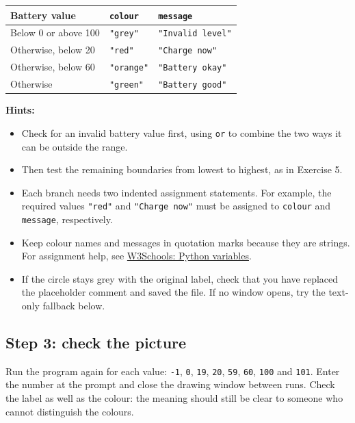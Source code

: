 \documentclass[12pt,a4paper]{article}
\begin{document}
\begingroup\small\renewcommand{\arraystretch}{1.3}\begin{longtable}{>{\raggedright\arraybackslash}p{}>{\raggedright\arraybackslash}p{}>{\raggedright\arraybackslash}p{}}
\toprule
\rowcolor{panel} Battery value & \texttt{colour} & \texttt{message} \\ \midrule\endhead
Below 0 or above 100 & \texttt{"grey"} & \texttt{"Invalid level"} \\
Otherwise, below 20 & \texttt{"red"} & \texttt{"Charge now"} \\
Otherwise, below 60 & \texttt{"orange"} & \texttt{"Battery okay"} \\
Otherwise & \texttt{"green"} & \texttt{"Battery good"} \\
\bottomrule\end{longtable}\endgroup
\textbf{Hints:}

\begin{itemize}
\item Check for an invalid battery value first, using \texttt{or} to combine the two ways it can be outside the range.
\item Then test the remaining boundaries from lowest to highest, as in Exercise 5.
\item Each branch needs two indented assignment statements. For example, the required values \texttt{"red"} and \texttt{"Charge now"} must be assigned to \texttt{colour} and \texttt{message}, respectively.
\item Keep colour names and messages in quotation marks because they are strings. For assignment help, see \href{https://www.w3schools.com/python/python_variables.asp}{W3Schools: Python variables}.
\item If the circle stays grey with the original label, check that you have replaced the placeholder comment and saved the file. If no window opens, try the text-only fallback below.
\end{itemize}
\subsection*{Step 3: check the picture}
Run the program again for each value: \texttt{-1}, \texttt{0}, \texttt{19}, \texttt{20}, \texttt{59}, \texttt{60}, \texttt{100} and \texttt{101}. Enter the number at the prompt and close the drawing window between runs. Check the label as well as the colour: the meaning should still be clear to someone who cannot distinguish the colours.
\end{document}
